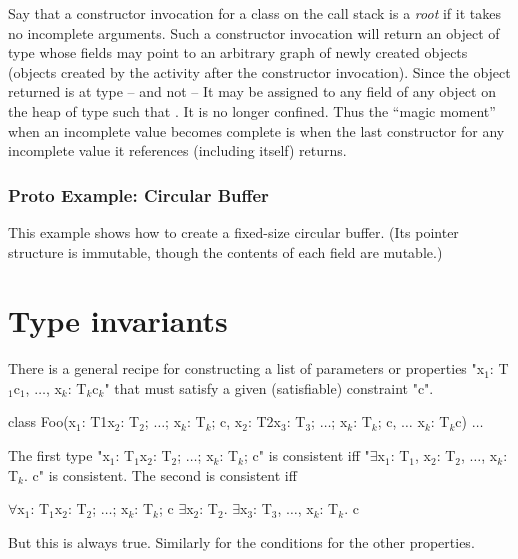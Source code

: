 Say that a constructor invocation for a class  on the call
stack is a {\em root} if it takes no incomplete arguments. Such a
constructor invocation will return an object of type  whose
fields may point to an arbitrary graph of newly created objects
(objects created by the activity after the constructor
invocation). Since the object returned is at type  -- and not
 -- It may be assigned to any field of any object on the
heap of type  such that .  It is no longer
confined. Thus the ``magic moment'' when an incomplete value becomes
complete is when the last constructor for any incomplete value it
references (including itself) returns.

\subsubsection{Proto Example: Circular Buffer}

\begin{example}
This example shows how to create a fixed-size circular buffer.
(Its pointer structure is immutable, though the contents of each
field are mutable.)
\end{example}


\section{Type invariants}\label{DepType:ClassGuard}

There is a general recipe for constructing a list of parameters or
properties \xcdmath"x$_1$: T$_1${c$_1$}, $\dots$, x$_k$: T$_k${c$_k$}" that must satisfy a given
(satisfiable) constraint \xcd"c". 

\begin{xtenmath}
class Foo(x$_1$: T1{x$_2$: T$_2$; $\dots$; x$_k$: T$_k$; c},
          x$_2$: T2{x$_3$: T$_3$; $\dots$; x$_k$: T$_k$; c},
          $\dots$
          x$_k$: T$_k${c}) {
  $\dots$
}
\end{xtenmath}

The first type \xcdmath"x$_1$: T$_1${x$_2$: T$_2$; $\dots$; x$_k$: T$_k$; c}" is consistent iff
\xcdmath"$\exists$x$_1$: T$_1$, x$_2$: T$_2$, $\dots$, x$_k$: T$_k$. c" is consistent. The second is
consistent iff
\begin{xtenmath}
$\forall$x$_1$: T$_1${x$_2$: T$_2$; $\dots$; x$_k$: T$_k$; c}
$\exists$x$_2$: T$_2$. $\exists$x$_3$: T$_3$, $\dots$, x$_k$: T$_k$. c
\end{xtenmath}
\noindent But this is always true. Similarly for the conditions for the other
properties.

